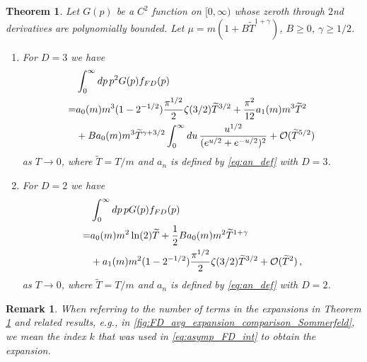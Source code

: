 \documentclass[sn-mathphys,Numbered]{sn-jnl}
\newtheorem{theorem}{Theorem}
\newtheorem{remark}{Remark}
\begin{document}
\begin{theorem}\label{thm:mu_zero_faster}
Let $G(p)$ be a $C^2$ function on $[0,\infty)$ whose zeroth through $2$nd derivatives are polynomially bounded.  Let $\mu=m(1+B\widetilde{T}^{1+\gamma})$, $B\geq 0$, $\gamma\geq 1/2$. 
\begin{enumerate}
    \item For $D=3$ we have
    \begin{align}
&\int_0^\infty dp\, p^{2} G(p) f_{FD}(p)\label{eq:FD_b_decay_orig_integral}\\
   =&a_0(m)m^{3}(1 - 2^{-1/2}) \frac{\pi^{1/2}}{2} \zeta(3/2)\widetilde{T}^{3/2}+  \frac{\pi^2}{12}a_1(m)m^{3}\widetilde{T}^{2}\label{eq:asymp_FD_int_b_decay}\\
   &+ Ba_0(m)m^{3}\widetilde{T}^{\gamma+3/2}\int_0^\infty du\,\frac{u^{1/2}}{(e^{u/2}+e^{-u/2})^2} 
   +\mathcal{O}(\widetilde{T}^{5/2})\notag
\end{align}
as $T\to 0$, where $\widetilde{T}=T/m$ and $a_n$ is defined by \eqref{eq:an_def} with $D=3$.
\item For $D=2$ we have
\begin{align}
&\int_0^\infty dp\, p G(p) f_{FD}(p)\\
   =& a_0(m)m^{2}\ln(2)\widetilde{T}
+\frac{1}{2}Ba_0(m)m^{2}\widetilde{T}^{1+\gamma}\\
   &+ a_1(m)m^{2}
 (1 - 2^{-1/2}) \frac{\pi^{1/2}}{2} \zeta(3/2)\widetilde{T}^{3/2}+ 
   \mathcal{O}(\widetilde{T}^{2})\,,\notag
\end{align}
as $T\to 0$, where $\widetilde{T}=T/m$ and $a_n$ is defined by \eqref{eq:an_def} with $D=2$.
\end{enumerate}
\end{theorem}
\begin{remark}
 When referring to the number of terms in the expansions in Theorem \ref{thm:mu_zero_faster} and related results, e.g., in \ref{fig:FD_avg_expansion_comparison_Sommerfeld},  we mean the index $k$ that was used in \eqref{eq:asymp_FD_int} to obtain the expansion.
\end{remark}
\end{document}
